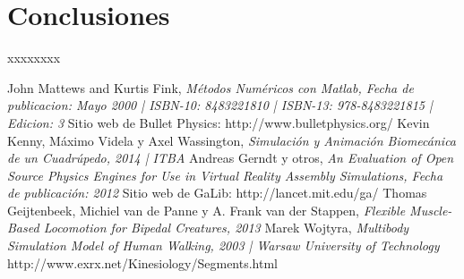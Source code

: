 \documentclass{article}
\begin{document}

\section{Conclusiones}

xxxxxxxx


\begin{thebibliography}{1}
John Mattews and Kurtis Fink, \emph{M\'etodos Num\'ericos con Matlab, Fecha de publicacion: Mayo 2000 | ISBN-10: 8483221810 | ISBN-13: 978-8483221815 | Edicion: 3}
 Sitio web de Bullet Physics: http://www.bulletphysics.org/
Kevin Kenny, M\'aximo Videla y Axel Wassington, \emph{Simulaci\'on y Animaci\'on Biomec\'anica de un Cuadr\'upedo, 2014 | ITBA}
Andreas Gerndt y otros, \emph{An Evaluation of Open Source Physics Engines for Use in Virtual Reality Assembly Simulations, Fecha de publicaci\'on: 2012}
 Sitio web de GaLib: http://lancet.mit.edu/ga/
Thomas Geijtenbeek, Michiel van de Panne y A. Frank van der Stappen, \emph{Flexible Muscle-Based Locomotion for Bipedal Creatures, 2013 }
Marek Wojtyra, \emph{Multibody Simulation Model of Human Walking, 2003 | Warsaw University of Technology}
 http://www.exrx.net/Kinesiology/Segments.html
\end{thebibliography}

\end{document}
